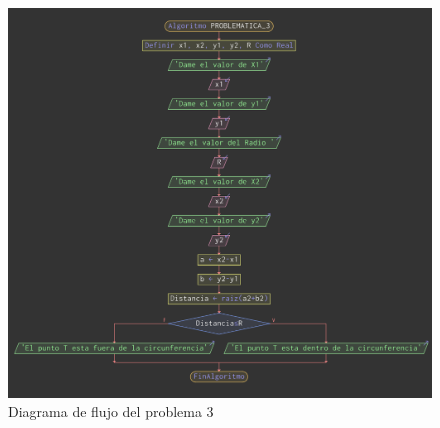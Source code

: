 \documentclass{IEEEcsmag}
\begin{document}
\begin{enumerate}
    \begin{figure}[h!]
        \centering
        \includegraphics[width=8 cm]{./latex-imagenes/Diagrama.png}
        \caption{Diagrama de flujo del problema 3}
        \label{fig:Diagramadeflujode2 problema2}
    \end{figure}
\end{enumerate}
\end{document}
